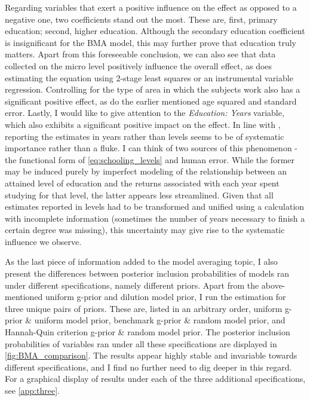 Regarding variables that exert a positive influence on the effect as opposed to a negative one, two coefficients stand out the most. These are, first, primary education; second, higher education. Although the secondary education coefficient is insignificant for the \ac{BMA} model, this may further prove that education truly matters. Apart from this foreseeable conclusion, we can also see that data collected on the micro level positively influence the overall effect, as does estimating the equation using 2-stage least squares or an instrumental variable regression. Controlling for the type of area in which the subjects work also has a significant positive effect, as do the earlier mentioned age squared and standard error. Lastly, I would like to give attention to the \textit{Education: Years} variable, which also exhibits a significant positive impact on the effect. In line with \cite{churchill2018meta}, reporting the estimates in years rather than levels seems to be of systematic importance rather than a fluke. I can think of two sources of this phenomenon - the functional form of \autoref{eq:schooling_levels} and human error. While the former may be induced purely by imperfect modeling of the relationship between an attained level of education and the returns associated with each year spent studying for that level, the latter appears less streamlined. Given that all estimates reported in levels had to be transformed and unified using a calculation with incomplete information (sometimes the number of years necessary to finish a certain degree was missing), this uncertainty may give rise to the systematic influence we observe.

As the last piece of information added to the model averaging topic, I also present the differences between posterior inclusion probabilities of models ran under different specifications, namely different priors. Apart from the above-mentioned uniform g-prior and dilution model prior, I run the estimation for three unique pairs of priors. These are, listed in an arbitrary order, uniform g-prior \& uniform model prior, benchmark g-prior \& random model prior, and Hannah-Quin criterion g-prior \& random model prior. The posterior inclusion probabilities of variables ran under all these specifications are displayed in \autoref{fig:BMA_comparison}. The results appear highly stable and invariable towards different specifications, and I find no further need to dig deeper in this regard. For a graphical display of results under each of the three additional specifications, see \autoref{app:three}.

